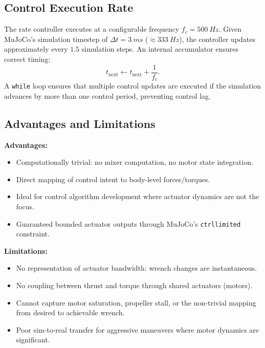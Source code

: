 \documentclass[journal]{IEEEtran}
\begin{document}
\subsection{Control Execution Rate}

The rate controller executes at a configurable frequency $f_c = \SI{500}{Hz}$. Given MuJoCo's simulation timestep of $\Delta t = \SI{3}{ms}$ ($\approx\SI{333}{Hz}$), the controller updates approximately every $1.5$ simulation steps. An internal accumulator ensures correct timing:
\begin{equation}
  t_{\text{next}} \leftarrow t_{\text{next}} + \frac{1}{f_c}.
  \label{eq:timing}
\end{equation}
A \texttt{while} loop ensures that multiple control updates are executed if the simulation advances by more than one control period, preventing control lag.

\subsection{Advantages and Limitations}

\textbf{Advantages:}
\begin{itemize}
  \item Computationally trivial: no mixer computation, no motor state integration.
  \item Direct mapping of control intent to body-level forces/torques.
  \item Ideal for control algorithm development where actuator dynamics are not the focus.
  \item Guaranteed bounded actuator outputs through MuJoCo's \texttt{ctrllimited} constraint.
\end{itemize}

\textbf{Limitations:}
\begin{itemize}
  \item No representation of actuator bandwidth: wrench changes are instantaneous.
  \item No coupling between thrust and torque through shared actuators (motors).
  \item Cannot capture motor saturation, propeller stall, or the non-trivial mapping from desired to achievable wrench.
  \item Poor sim-to-real transfer for aggressive maneuvers where motor dynamics are significant.
\end{itemize}


\end{document}
